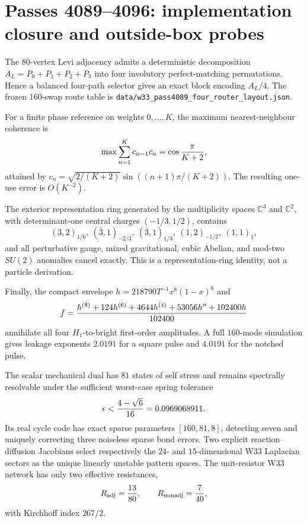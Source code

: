 \makeatletter
{}
\makeatother
\section{Passes 4089--4096: implementation closure and outside-box probes}
\label{sec:pass4089-4096}

\begin{theorem}
The $80$-vertex Levi adjacency admits a deterministic decomposition $A_L=P_0+P_1+P_2+P_3$ into four involutory perfect-matching permutations. Hence a balanced four-path selector gives an exact block encoding $A_L/4$. The frozen $160$-swap route table is \texttt{data/w33\_pass4089\_four\_router\_layout.json}.

For a finite phase reference on weights $0,\ldots,K$, the maximum nearest-neighbour coherence is
\[
\max\sum_{n=1}^Kc_{n-1}c_n=\cos{\pi\over K+2},
\]
attained by $c_n=\sqrt{2/(K+2)}\sin((n+1)\pi/(K+2))$. The resulting one-use error is $O(K^{-2})$.

The exterior representation ring generated by the multiplicity spaces $\mathbb C^3$ and $\mathbb C^2$, with determinant-one central charges $(-1/3,1/2)$, contains
\[
(3,2)_{1/6},\ (\bar3,1)_{-2/3},\ (\bar3,1)_{1/3},\ (1,2)_{-1/2},\ (1,1)_1,
\]
and all perturbative gauge, mixed gravitational, cubic Abelian, and mod-two $SU(2)$ anomalies cancel exactly. This is a representation-ring identity, not a particle derivation.

Finally, the compact envelope $h=218790T^{-1}x^8(1-x)^8$ and
\[
f={h^{(8)}+124h^{(6)}+4644h^{(4)}+53056h''+102400h\over102400}
\]
annihilate all four $H_1$-to-bright first-order amplitudes. A full $160$-mode simulation gives leakage exponents $2.0191$ for a square pulse and $4.0191$ for the notched pulse.
\end{theorem}

\begin{corollary}
The scalar mechanical dual has $81$ states of self stress and remains spectrally resolvable under the sufficient worst-case spring tolerance
\[
\epsilon<{4-\sqrt6\over16}=0.0969068911.
\]
Its real cycle code has exact sparse parameters $[160,81,8]$, detecting seven and uniquely correcting three noiseless sparse bond errors. Two explicit reaction--diffusion Jacobians select respectively the $24$- and $15$-dimensional W33 Laplacian sectors as the unique linearly unstable pattern spaces. The unit-resistor W33 network has only two effective resistances,
\[
R_{\rm adj}={13\over80},\qquad R_{\rm nonadj}={7\over40},
\]
with Kirchhoff index $267/2$.
\end{corollary}

